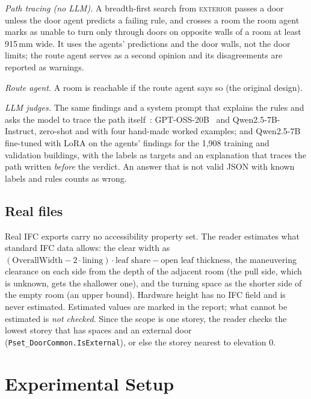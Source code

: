 \documentclass[conference]{IEEEtran}
\begin{document}
\emph{Path tracing (no LLM).} A breadth-first search from \textsc{exterior} passes a door unless the door agent
predicts a failing rule, and crosses a room the room agent marks as unable to turn only through doors on opposite
walls of a room at least 915\,mm wide. It uses the agents' predictions and the door walls, not the door limits; the
route agent serves as a second opinion and its disagreements are reported as warnings.

\emph{Route agent.} A room is reachable if the route agent says so (the original design).

\emph{LLM judges.} The same findings and a system prompt that explains the rules and asks the model to trace the
path itself~\cite{zheng2023judge}: GPT-OSS-20B~\cite{gptoss2025} and Qwen2.5-7B-Instruct, zero-shot and with four
hand-made worked examples; and Qwen2.5-7B fine-tuned with LoRA on the agents' findings for the 1,908 training and
validation buildings, with the labels as targets and an explanation that traces the path written \emph{before}
the verdict. An answer that is not valid JSON with known labels and rules counts as wrong.

\subsection{Real files}

Real IFC exports carry no accessibility property set. The reader estimates what standard IFC data allows: the clear
width as $(\text{OverallWidth} - 2\cdot\text{lining})\cdot\text{leaf share} - \text{open leaf thickness}$, the
maneuvering clearance on each side from the depth of the adjacent room (the pull side, which is unknown, gets the
shallower one), and the turning space as the shorter side of the empty room (an upper bound). Hardware height has no
IFC field and is never estimated. Estimated values are marked in the report; what cannot be estimated is
\emph{not checked}. Since the scope is one storey, the reader checks the lowest storey that has spaces and an
external door (\texttt{Pset\_DoorCommon.IsExternal}), or else the storey nearest to elevation 0.

\section{Experimental Setup}
\end{document}
